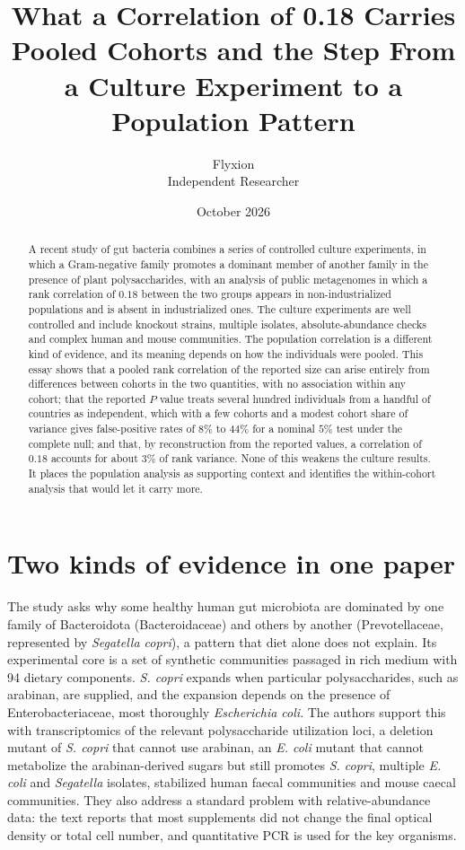 \documentclass[11pt]{article}
\title{What a Correlation of 0.18 Carries\\[4pt]
\large Pooled Cohorts and the Step From a Culture Experiment to a Population Pattern}
\author{Flyxion\\Independent Researcher}
\date{October 2026}
\theoremstyle{definition}
\begin{document}
\maketitle

\begin{abstract}
\noindent
A recent study of gut bacteria combines a series of controlled culture experiments, in which a Gram-negative family promotes a dominant member of another family in the presence of plant polysaccharides, with an analysis of public metagenomes in which a rank correlation of $0.18$ between the two groups appears in non-industrialized populations and is absent in industrialized ones. The culture experiments are well controlled and include knockout strains, multiple isolates, absolute-abundance checks and complex human and mouse communities. The population correlation is a different kind of evidence, and its meaning depends on how the individuals were pooled. This essay shows that a pooled rank correlation of the reported size can arise entirely from differences between cohorts in the two quantities, with no association within any cohort; that the reported $P$ value treats several hundred individuals from a handful of countries as independent, which with a few cohorts and a modest cohort share of variance gives false-positive rates of $8\%$ to $44\%$ for a nominal $5\%$ test under the complete null; and that, by reconstruction from the reported values, a correlation of $0.18$ accounts for about $3\%$ of rank variance. None of this weakens the culture results. It places the population analysis as supporting context and identifies the within-cohort analysis that would let it carry more.
\end{abstract}

\section{Two kinds of evidence in one paper}

The study \citep{tawk2026} asks why some healthy human gut microbiota are dominated by one family of Bacteroidota (Bacteroidaceae) and others by another (Prevotellaceae, represented by \emph{Segatella copri}), a pattern that diet alone does not explain. Its experimental core is a set of synthetic communities passaged in rich medium with 94 dietary components. \emph{S. copri} expands when particular polysaccharides, such as arabinan, are supplied, and the expansion depends on the presence of Enterobacteriaceae, most thoroughly \emph{Escherichia coli}. The authors support this with transcriptomics of the relevant polysaccharide utilization loci, a deletion mutant of \emph{S. copri} that cannot use arabinan, an \emph{E. coli} mutant that cannot metabolize the arabinan-derived sugars but still promotes \emph{S. copri}, multiple \emph{E. coli} and \emph{Segatella} isolates, stabilized human faecal communities and mouse caecal communities. They also address a standard problem with relative-abundance data: the text reports that most supplements did not change the final optical density or total cell number, and quantitative PCR is used for the key organisms.
\end{document}
